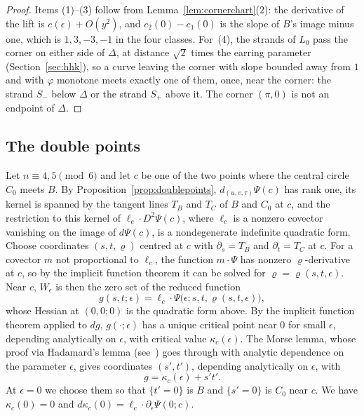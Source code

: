 \begin{proof}
Items (1)--(3) follow from Lemma~\ref{lem:cornerchart}(2): the derivative of the lift is $c(\epsilon)+O(y^2)$, and
$c_2(0)-c_1(0)$ is the slope of $B$'s image minus one, which is $1,3,-3,-1$ in the four classes. For~(4), the
strands of $L_0$ pass the corner on either side of $\Delta$, at distance $\sqrt2$ times the earring parameter
(Section~\ref{sec:hhk}), so a
curve leaving the corner with slope bounded away from $1$ and with $\varphi$ monotone meets exactly one of
them, once, near the corner: the strand $S_-$ below $\Delta$ or the strand $S_+$ above it. The corner $(\pi,0)$ is
not an endpoint of $\Delta$.
\end{proof}

\subsection{The double points}\label{subsec:doublepoints}

Let $n\equiv4,5\pmod6$ and let $c$ be one of the two points where the central circle $C_0$ meets $B$. By
Proposition~\ref{prop:doublepoints}, $d_{(u,v,\tau)}\Psi(c)$ has rank one, its kernel is spanned by the tangent lines
$T_B$ and $T_C$ of $B$ and $C_0$ at $c$, and the restriction to this kernel of $\ell_c\cdot D^2\Psi(c)$, where $\ell_c$ is
a nonzero covector vanishing on the image of $d\Psi(c)$, is a nondegenerate indefinite quadratic form. Choose
coordinates $(s,t,\varrho)$ centred at $c$ with $\partial_s=T_B$ and $\partial_t=T_C$ at $c$. For a covector $m$ not proportional to $\ell_c$, the function $m\cdot\Psi$ has nonzero $\varrho$-derivative at $c$, so by the implicit function theorem it can be solved for
$\varrho=\varrho(s,t,\epsilon)$. Near $c$, $W_\epsilon$ is then the zero set of the reduced function
$$g(s,t;\epsilon)=\ell_c\cdot\Psi\bigl(\epsilon;s,t,\varrho(s,t,\epsilon)\bigr),$$
whose Hessian at $(0,0;0)$ is the quadratic form above. By the implicit function theorem applied to $dg$, $g(\cdot;\epsilon)$ has a
unique critical point near $0$ for small $\epsilon$, depending analytically on $\epsilon$, with critical value
$\kappa_c(\epsilon)$. The Morse lemma, whose proof via Hadamard's lemma (see~\cite[Lemma~2.2]{Milnor}) goes through with
analytic dependence on the parameter $\epsilon$, gives coordinates $(s',t')$, depending analytically on $\epsilon$, with
$$g=\kappa_c(\epsilon)+s't'.$$
At $\epsilon=0$ we choose them so that $\{t'=0\}$ is $B$ and $\{s'=0\}$ is $C_0$ near $c$. We have $\kappa_c(0)=0$ and
$d\kappa_c(0)=\ell_c\cdot\partial_\epsilon\Psi(0;c)$.

